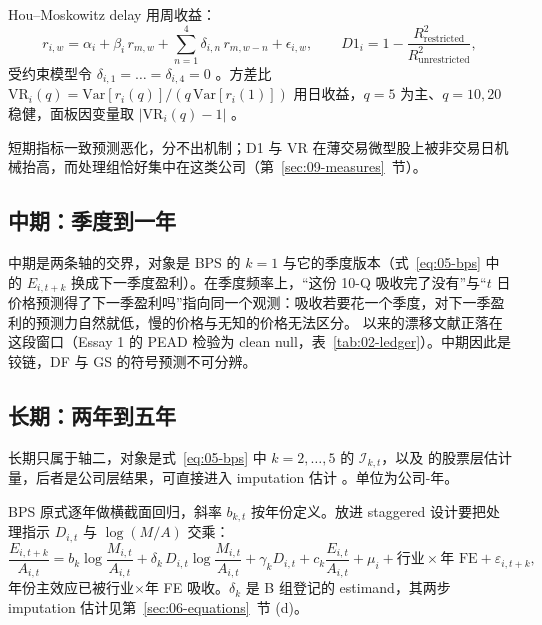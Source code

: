 \documentclass[a4paper,11pt]{ctexart}
\begin{document}
Hou--Moskowitz delay 用周收益：
\begin{equation}\label{eq:05-d1}
r_{i,w}=\alpha_i+\beta_{i}\,r_{m,w}+\sum_{n=1}^{4}\delta_{i,n}\,r_{m,w-n}+\epsilon_{i,w},\qquad
D1_i=1-\frac{R^2_{\text{restricted}}}{R^2_{\text{unrestricted}}},
\end{equation}
受约束模型令 $\delta_{i,1}=\dots=\delta_{i,4}=0$ \citep{houmoskowitz2005}。方差比 $\mathrm{VR}_i(q)=\mathrm{Var}[r_i(q)]/(q\,\mathrm{Var}[r_i(1)])$ 用日收益，$q=5$ 为主、$q=10,20$ 稳健，面板因变量取 $\lvert\mathrm{VR}_i(q)-1\rvert$ \citep{lomackinlay1988}。

短期指标一致预测恶化，分不出机制；D1 与 VR 在薄交易微型股上被非交易日机械抬高，而处理组恰好集中在这类公司（第~\ref{sec:09-measures}~节）。

\subsection{中期：季度到一年}\label{sec:05-mid}

中期是两条轴的交界，对象是 BPS 的 $k=1$ 与它的季度版本（式~\eqref{eq:05-bps} 中的 $E_{i,t+k}$ 换成下一季度盈利）。在季度频率上，“这份 10-Q 吸收完了没有”与“$t$ 日价格预测得了下一季盈利吗”指向同一个观测：吸收若要花一个季度，对下一季盈利的预测力自然就低，慢的价格与无知的价格无法区分。\citet{ballbrown1968} 以来的漂移文献正落在这段窗口（Essay 1 的 PEAD 检验为 clean null，表~\ref{tab:02-ledger}）。中期因此是铰链，DF 与 GS 的符号预测不可分辨。

\subsection{长期：两年到五年}\label{sec:05-long}

长期只属于轴二，对象是式~\eqref{eq:05-bps} 中 $k=2,\dots,5$ 的 $\mathcal{I}_{k,t}$，以及 \citet{davilaparlatore2026} 的股票层估计量，后者是公司层结果，可直接进入 imputation 估计 \citep{borusyakjaravelspiess2024}。单位为公司-年。

BPS 原式逐年做横截面回归，斜率 $b_{k,t}$ 按年份定义。放进 staggered 设计要把处理指示 $D_{i,t}$ 与 $\log(M/A)$ 交乘：
\begin{equation}\label{eq:05-bps-did}
\frac{E_{i,t+k}}{A_{i,t}}=b_{k}\log\frac{M_{i,t}}{A_{i,t}}+\delta_{k}\,D_{i,t}\log\frac{M_{i,t}}{A_{i,t}}+\gamma_{k}D_{i,t}+c_k\frac{E_{i,t}}{A_{i,t}}+\mu_i+\text{行业}\times\text{年 FE}+\varepsilon_{i,t+k},
\end{equation}
年份主效应已被行业$\times$年 FE 吸收。$\delta_k$ 是 B 组登记的 estimand，其两步 imputation 估计见第~\ref{sec:06-equations}~节 (d)。
\end{document}
